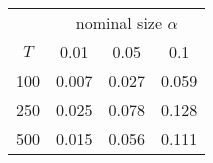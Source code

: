 % 
\begin{tabular}{cccc}
  \hline
  & \multicolumn{3}{c}{nominal size $\alpha$} \\
 $T$ & 0.01 & 0.05 & 0.1 \\
 \hline
100 & 0.007 & 0.027 & 0.059 \\ 
  250 & 0.025 & 0.078 & 0.128 \\ 
  500 & 0.015 & 0.056 & 0.111 \\ 
   \hline
\end{tabular}
